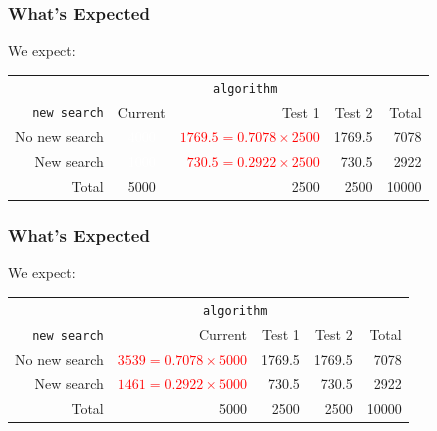 \documentclass[slides]{beamer}
\newcommand{\white}[1]{\textcolor{white}{#1}}
\newcommand{\red}[1]{\textcolor{red}{#1}}
\begin{document}
\begin{frame}
\frametitle{What's Expected}

We expect:
\begin{center}
  \begin{tabular}{r|crr|r}
& \multicolumn{3}{c|}{{\tt algorithm}} & \\
       {\tt new search} & Current & Test 1 & Test 2 & Total \\ 
\hline
    No new search & \white{4000} & \red{$1769.5=0.7078 \times 2500$} & 1769.5 & 7078 \\ 
    New search & \white{1000} & \red{$730.5=0.2922 \times 2500$} & 730.5 & 2922 \\ 
\hline
    Total & 5000 & 2500 & 2500 & 10000 \\ 
  \end{tabular}
\end{center}

\end{frame}


\begin{frame}
\frametitle{What's Expected}

We expect:
\begin{center}
  \begin{tabular}{r|rrr|r}
& \multicolumn{3}{c|}{{\tt algorithm}} & \\
       {\tt new search} & Current & Test 1 & Test 2 & Total \\ 
\hline
    No new search & \red{$3539=0.7078 \times 5000$} & 1769.5 & 1769.5 & 7078 \\ 
    New search & \red{$1461=0.2922 \times 5000$} & 730.5 & 730.5 & 2922 \\ 
\hline
    Total & 5000 & 2500 & 2500 & 10000 \\ 
  \end{tabular}
\end{center}

\end{frame}
\end{document}
